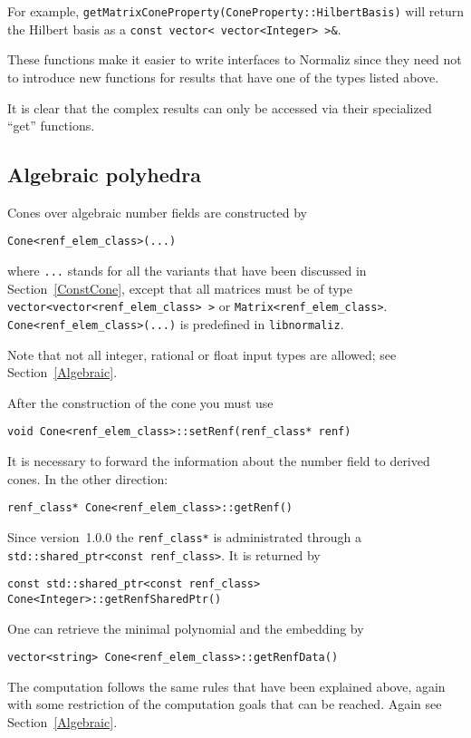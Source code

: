 \documentclass[12pt,a4paper]{scrartcl}
\theoremstyle{definition}
\def\ttt{\texttt}
\begin{document}
\begin{small}
For example, \verb|getMatrixConeProperty(ConeProperty::HilbertBasis)| will return the Hilbert basis as a \verb|const vector< vector<Integer> >&|.

These functions make it easier to write interfaces to Normaliz since they need not to introduce new functions for results that have one of the types listed above.

It is clear that the complex results can only be accessed via their specialized ``get'' functions.

\subsection{Algebraic polyhedra}

Cones over algebraic number fields are constructed by
\begin{Verbatim}
Cone<renf_elem_class>(...)
\end{Verbatim}
where \ttt{...} stands for all the variants that have been discussed in Section~\ref{ConstCone}, except that all matrices must be of type \verb+vector<vector<renf_elem_class> >+ or \verb+Matrix<renf_elem_class>+. \verb|Cone<renf_elem_class>(...)| is predefined in \ttt{libnormaliz}.

Note that not all integer, rational or float input types are allowed; see Section~\ref{Algebraic}.

After the construction of the cone you must use
\begin{Verbatim}
void Cone<renf_elem_class>::setRenf(renf_class* renf)
\end{Verbatim}
It is necessary to forward the information about the number field to derived cones. In the other direction:
\begin{Verbatim}
renf_class* Cone<renf_elem_class>::getRenf()
\end{Verbatim}
Since version~1.0.0 the \verb|renf_class*| is administrated through a \verb|std::shared_ptr<const renf_class>|. It is returned by
\begin{Verbatim}
const std::shared_ptr<const renf_class> Cone<Integer>::getRenfSharedPtr()
\end{Verbatim}

One can retrieve the minimal polynomial and the embedding by
\begin{Verbatim}
vector<string> Cone<renf_elem_class>::getRenfData()
\end{Verbatim}

The computation follows the same rules that have been explained above, again with some restriction of the computation goals that can be reached. Again see Section~\ref{Algebraic}.


\end{small}
\end{document}
